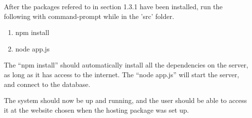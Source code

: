 After the packages refered to in section 1.3.1 have been installed, run the following with command-prompt while in the 'src' folder. 
\begin{enumerate} 
\item npm install 
\item node app.js 
\end{enumerate}

The ``npm install'' should automatically install all the dependencies on the server, as long as it has access to the internet.
The ``node app.js'' will start the server, and connect to the database.

The system should now be up and running, and the user should be able to access it at the website chosen when the hosting package was set up.
